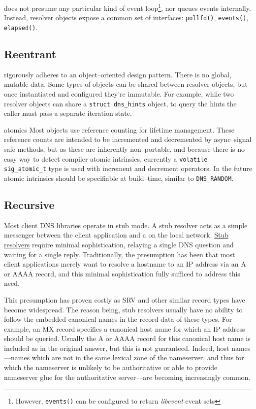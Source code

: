 \documentclass[11pt]{article}
\begin{document}
\dnsc does not presume any particular kind of event loop\footnote{However,
\texttt{events()} can be configured to return \textit{libevent} event sets},
nor queues events internally. Instead, resolver objects expose a common set
of interfaces: \texttt{pollfd()}, \texttt{events()}, \texttt{elapsed()}.

\subsection{Reentrant}

\dnsc rigorously adheres to an object--oriented design pattern. There is no
global, mutable data. Some types of objects can be shared between resolver
objects, but once instantiated and configured they're immutable. For
example, while two resolver objects can share a \texttt{struct dns\_hints}
object, to query the hints the caller must pass a separate iteration state.

\hfill

\begin{todo}{atomics}
Most objects use reference counting for
lifetime management. These reference counts are intended to be incremented
and decremented by async--signal safe methods, but as these are inherently
non--portable, and because there is no easy way to detect compiler atomic
intrinsics, currently a \texttt{volatile sig\_atomic\_t} type is used with
increment and decrement operators. In the future atomic intrinsics should be
specifiable at build--time, similar to \texttt{DNS\_RANDOM}.
\end{todo}

\subsection{Recursive}

Most client DNS libraries operate in stub mode. A stub resolver acts as a
simple messenger between the client application and a  on the local network. \hyperref[stub resolver]{Stub
resolvers} require minimal sophistication, relaying a
single DNS question and waiting for a single reply. Traditionally, the
presumption has been that most client applications merely want to resolve a
hostname to an IP address via an A or AAAA record, and this minimal
sophistication fully sufficed to address this need.

This presumption has proven costly as SRV and other similar record types
have become widespread. The reason being, stub resolvers usually have no
ability to follow the embedded canonical names in the record data of these
types. For example, an MX record specifies a canonical host name for which
an IP address should be queried. Usually the A or AAAA record for this
canonical host name is included as  in the original answer, but
this is not guaranteed. Indeed,  host names---names
which are not in the same lexical zone of the nameserver, and thus for which
the nameserver is unlikely to be authoritative or able to provide nameserver
glue for the authoritative server---are becoming increasingly common.
\end{document}
